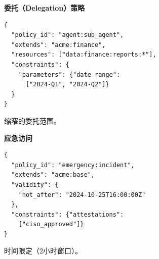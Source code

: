 {\vspace{0.5em}
\noindent\begin{minipage}[t]{0.48\columnwidth}
\textbf{委托（Delegation）策略}
\begin{lstlisting}[basicstyle=\ttfamily\scriptsize]
{
  "policy_id": "agent:sub_agent",
  "extends": "acme:finance",
  "resources": ["data:finance:reports:*"],
  "constraints": {
    "parameters": {"date_range":
      ["2024-Q1", "2024-Q2"]}
  }
}
\end{lstlisting}
缩窄的委托范围。
\end{minipage}
\hfill
\begin{minipage}[t]{0.48\columnwidth}
\textbf{应急访问}
\begin{lstlisting}[basicstyle=\ttfamily\scriptsize]
{
  "policy_id": "emergency:incident",
  "extends": "acme:base",
  "validity": {
    "not_after": "2024-10-25T16:00:00Z"
  },
  "constraints": {"attestations":
    ["ciso_approved"]}
}
\end{lstlisting}
时间限定（2小时窗口）。
\end{minipage}
}
